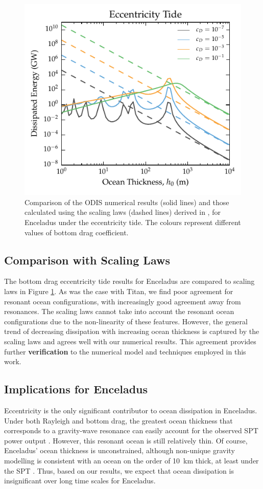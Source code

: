 \begin{figure}[!t]
\centering
\includegraphics[width=0.55\linewidth]{Figures/enceladus_scaling}
\caption{Comparison of the ODIS numerical results (solid lines) and those calculated using the scaling laws (dashed lines) derived in \citet{chen2013tidal}, for Enceladus under the eccentricity tide. The colours represent different values of bottom drag coefficient. \label{fig:scalEncel}}
\end{figure}

\subsection{Comparison with Scaling Laws}

The bottom drag eccentricity tide results for Enceladus are compared to \citet{chen2013tidal} scaling laws in Figure \ref{fig:scalEncel}. As was the case with Titan, we find poor agreement for resonant ocean configurations, with increasingly good agreement away from resonances. The scaling laws cannot take into account the resonant ocean configurations due to the non-linearity of these features. However, the general trend of decreasing dissipation with increasing ocean thickness is captured by the scaling laws and agrees well with our numerical results. This agreement provides further \textbf{verification} to the numerical model and techniques employed in this work.

\subsection{Implications for Enceladus}

Eccentricity is the only significant contributor to ocean dissipation in Enceladus. Under both Rayleigh and bottom drag, the greatest ocean thickness that corresponds to a gravity-wave resonance can easily account for the observed SPT power output \citep{spencer2006cassini,howett2011high,spencer2013new}. However, this resonant ocean is still relatively thin. Of course, Enceladus' ocean thickness is unconstrained, although non-unique gravity modelling is consistent with an ocean on the order of \SI{10}{\kilo\metre} thick, at least under the SPT \citep{iess2014gravity}. Thus, based on our results, we expect that ocean dissipation is insignificant over long time scales for Enceladus. 

